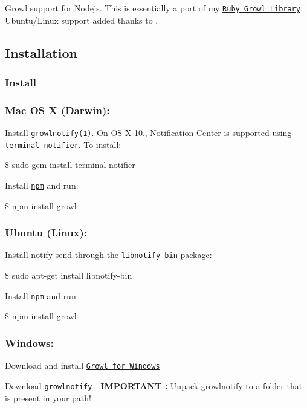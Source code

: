 \href{https://travis-ci.org/tj/node-growl}{\tt }

Growl support for Nodejs. This is essentially a port of my \href{http://github.com/visionmedia/growl}{\tt Ruby Growl Library}. Ubuntu/\+Linux support added thanks to \href{http://github.com/niftylettuce}{\tt }.

\subsection*{Installation}

\subsubsection*{Install}

\subsubsection*{Mac OS X (Darwin)\+:}

Install \href{http://growl.info/extras.php#growlnotify}{\tt growlnotify(1)}. On OS X 10., Notification Center is supported using \href{https://github.com/alloy/terminal-notifier}{\tt terminal-\/notifier}. To install\+:

\$ sudo gem install terminal-\/notifier

Install \href{http://npmjs.org/}{\tt npm} and run\+:

\$ npm install growl

\subsubsection*{Ubuntu (Linux)\+:}

Install {\ttfamily notify-\/send} through the \href{http://packages.ubuntu.com/libnotify-bin}{\tt libnotify-\/bin} package\+:

\$ sudo apt-\/get install libnotify-\/bin

Install \href{http://npmjs.org/}{\tt npm} and run\+:

\$ npm install growl

\subsubsection*{Windows\+:}

Download and install \href{http://www.growlforwindows.com/gfw/default.aspx}{\tt Growl for Windows}

Download \href{http://www.growlforwindows.com/gfw/help/growlnotify.aspx}{\tt growlnotify} -\/ {\bfseries I\+M\+P\+O\+R\+T\+A\+NT \+:} Unpack growlnotify to a folder that is present in your path!

